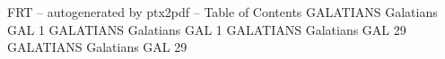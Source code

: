 \id FRT -- autogenerated by ptx2pdf --
\is Table of Contents
\tr {} GALATIANS Galatians GAL 1
\tr {} GALATIANS Galatians GAL 1
\tr {} GALATIANS Galatians GAL 29
\tr {} GALATIANS Galatians GAL 29
